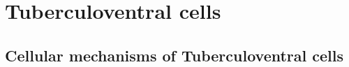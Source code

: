 \section{Tuberculoventral cells}


\subsection{Cellular mechanisms of Tuberculoventral cells}

\citep{RubioJuiz:2004}





